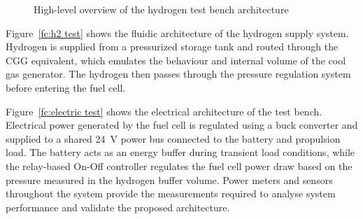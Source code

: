 \begin{figure}[htp]
    \centering

    \caption{High-level overview of the hydrogen test bench architecture}
    \label{fig:h2_overview}
\end{figure}

Figure~\ref{fc:h2 test} shows the fluidic architecture of the hydrogen supply system. Hydrogen is supplied from a pressurized storage tank and routed through the CGG equivalent, which emulates the behaviour and internal volume of the cool gas generator. The hydrogen then passes through the pressure regulation system before entering the fuel cell.

Figure~\ref{fc:electric test} shows the electrical architecture of the test bench. Electrical power generated by the fuel cell is regulated using a buck converter and supplied to a shared 24~V power bus connected to the battery and propulsion load. The battery acts as an energy buffer during transient load conditions, while the relay-based On-Off controller regulates the fuel cell power draw based on the pressure measured in the hydrogen buffer volume. Power meters and sensors throughout the system provide the measurements required to analyse system performance and validate the proposed architecture.

